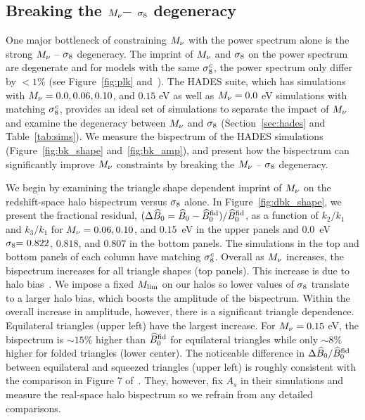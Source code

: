 \subsection{Breaking the $M_\nu$-- $\sigma_8$ degeneracy} \label{sec:mnusig}
One major bottleneck of constraining $M_\nu$ with the power spectrum alone is the 
strong $M_\nu$ -- $\sigma_8$ degeneracy. The imprint of $M_\nu$ and $\sigma_8$ on the power 
spectrum are degenerate and for models with the same $\sigma_8^c$, the power spectrum
only differ by $< 1\%$ (see Figure~\ref{fig:plk} and~\citealt{villaescusa-navarro2018}). 
The HADES suite, which has simulations with $M_\nu = 0.0, 0.06, 0.10$, 
and $0.15$ eV as well as $M_\nu = 0.0$ eV simulations with matching $\sigma_8^{c}$, 
provides an ideal set of simulations to separate the impact of $M_\nu$ and 
examine the degeneracy between $M_\nu$ and $\sigma_8$ (Section~\ref{sec:hades} and Table~\ref{tab:sims}). 
We measure the bispectrum of the HADES simulations (Figure~\ref{fig:bk_shape} and~\ref{fig:bk_amp}), 
and present how the bispectrum can significantly improve $M_\nu$ constraints 
by breaking the $M_\nu$ -- $\sigma_8$ degeneracy. 

We begin by examining the triangle shape dependent imprint of $M_\nu$ on the 
redshift-space halo bispectrum versus $\sigma_8$ alone. In Figure~\ref{fig:dbk_shape}, 
we present the fractional residual, $(\Delta \widehat{B}_0 = \widehat{B}_0 - \widehat{B}_0^{\rm fid})/\widehat{B}_0^{\rm fid}$,
as a function of $k_2/k_1$ and $k_3/k_1$ for $M_\nu=0.06, 0.10$, and $0.15$~eV 
in the upper panels and 0.0~eV $\sigma_8{=}~0.822$, $0.818$, and $0.807$ in the 
bottom panels. The simulations in the top and bottom panels of each column 
have matching $\sigma_8^{c}$. Overall as $M_\nu$ increases, the bispectrum increases 
for all triangle shapes (top panels). This increase is due to halo 
bias~\citep[][see also Figure~\ref{fig:plk}]{villaescusa-navarro2018}. We 
impose a fixed $M_{\rm lim}$ on our halos so lower values of $\sigma_8$ translate 
to a larger halo bias, which boosts the amplitude of the bispectrum. Within the 
overall increase in amplitude, however, there is a significant triangle dependence. 
Equilateral triangles (upper left) have the largest increase. For $M_\nu=0.15$ eV, 
the bispectrum is $\sim 15\%$ higher than $\widehat{B}_0^{\rm fid}$ for equilateral triangles 
while only $\sim 8\%$ higher for folded triangles (lower center). The noticeable 
difference in $\Delta \widehat{B}_0/\widehat{B}_0^{\rm fid}$ between equilateral and squeezed 
triangles (upper left) is roughly consistent with the comparison in Figure 7 
of~\cite{ruggeri2018}. They, however, fix $A_s$ in their simulations and 
measure the real-space halo bispectrum so we refrain from any detailed 
comparisons. 

